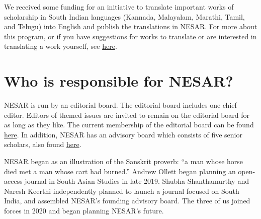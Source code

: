 We received some funding for an initiative to translate important works of scholarship in South Indian languages (Kannada, Malayalam, Marathi, Tamil, and Telugu) into English and publish the translations in NESAR. For more about this program, or if you have suggestions for works to translate or are interested in translating a work yourself, see \href{https://nesarjournal.org/translations}{here}.

\section{Who is responsible for NESAR?}\label{lq0qsyc9zvaw}
      NESAR is run by an editorial board. The editorial board includes one chief editor. Editors of themed issues are invited to remain on the editorial board for as long as they like. The current membership of the editorial board can be found \href{https://nesarjournal.org/about\#people}{here}. In addition, NESAR has an advisory board which consists of five senior scholars, also found \href{https://nesarjournal.org/about\#people}{here}.

NESAR began as an illustration of the Sanskrit proverb: “a man whose horse died met a man whose cart had burned.” Andrew Ollett began planning an open-access journal in South Asian Studies in late 2019. Shubha Shanthamurthy and Naresh Keerthi independently planned to launch a journal focused on South India, and assembled NESAR’s founding advisory board. The three of us joined forces in 2020 and began planning NESAR’s future. 
